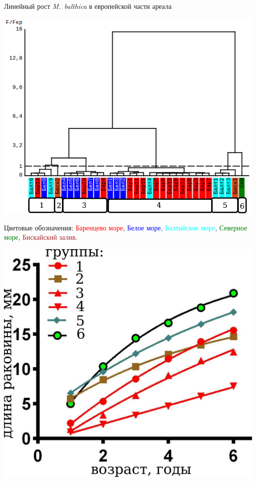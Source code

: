 \documentclass{beamer}
\begin{document}
\begin{frame}{Линейный рост {\it M.~balthica} в европейской части ареала}
	\begin{minipage}[t]{.52\linewidth}
		\begin{center}
			\includegraphics[width=\textwidth]{./Europe_clusters_usrednenie.pdf}
		\end{center}

Цветовые обозначения: \textcolor{red}{Баренцево море}, 
\textcolor{blue}{Белое море}, 
\textcolor{cyan}{Балтийское море}, 
\textcolor{green}{Северное море}, 
\textcolor{brown}{Бискайский залив}.
	\end{minipage}
%
	\begin{minipage}[t]{.45\linewidth}
		\begin{center}
			\includegraphics[width=\textwidth]{./Europe_growth_groups_prizm.pdf}
		\end{center}
	\end{minipage}
\end{frame}
\end{document}
